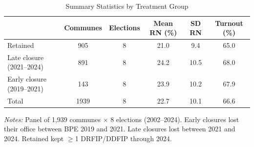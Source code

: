 \begin{table}[htbp]
\centering
\small
\caption{Summary Statistics by Treatment Group}
\label{tab:summary}
\begin{threeparttable}
\begin{tabular}{lccccc}
\toprule
 & Communes & Elections & Mean RN (\%) & SD RN & Turnout (\%) \\
\midrule
Retained & 905 & 8 & 21.0 &  9.4 & 65.0 \\
Late closure (2021--2024) & 891 & 8 & 24.2 & 10.5 & 68.0 \\
Early closure (2019--2021) & 143 & 8 & 23.9 & 10.2 & 67.9 \\
\midrule
Total & 1939 & 8 & 22.7 & 10.1 & 66.6 \\
\bottomrule
\end{tabular}
\end{threeparttable}
\vspace{0.3em}
\parbox{\textwidth}{\footnotesize \textit{Notes:} Panel of 1,939 communes $\times$ 8 elections (2002--2024). Early closures lost their office between BPE 2019 and 2021. Late closures lost between 2021 and 2024. Retained kept $\geq$1 DRFIP/DDFIP through 2024.}
\end{table}

